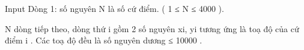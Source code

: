 Input
Dòng 1: số nguyên N là số cứ điểm. ( 1 ≤ N ≤ 4000 ).   


   N dòng tiếp theo, dòng thứ i gồm 2 số nguyên xi, yi tương ứng là toạ độ của cứ điểm i . Các toạ độ đều là số nguyên dương ≤ 10000 .